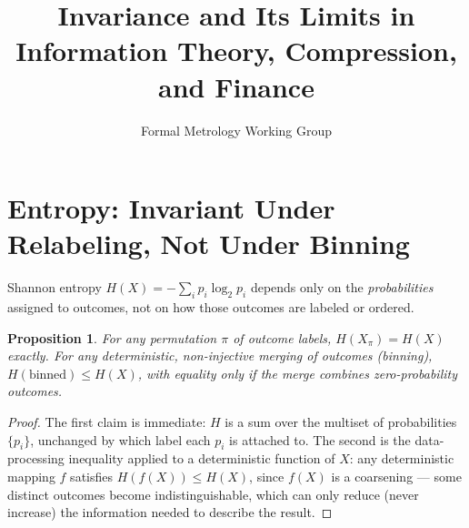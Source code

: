\documentclass[10pt,journal,compsoc]{IEEEtran}
\newtheorem{proposition}{Proposition}
\begin{document}
\title{Invariance and Its Limits in Information Theory, Compression, and Finance}
\author{Formal Metrology Working Group}


\maketitle

\section{Entropy: Invariant Under Relabeling, Not Under Binning}
Shannon entropy $H(X) = -\sum_i p_i\log_2 p_i$ depends only on the \emph{probabilities} assigned to outcomes, not on how those outcomes are labeled or ordered.

\begin{proposition}
For any permutation $\pi$ of outcome labels, $H(X_\pi) = H(X)$ exactly. For any deterministic, non-injective merging of outcomes (binning), $H(\text{binned}) \le H(X)$, with equality only if the merge combines zero-probability outcomes.
\end{proposition}
\begin{proof}
The first claim is immediate: $H$ is a sum over the multiset of probabilities $\{p_i\}$, unchanged by which label each $p_i$ is attached to. The second is the data-processing inequality applied to a deterministic function of $X$: any deterministic mapping $f$ satisfies $H(f(X)) \le H(X)$, since $f(X)$ is a coarsening — some distinct outcomes become indistinguishable, which can only reduce (never increase) the information needed to describe the result.
\end{proof}
\end{document}
